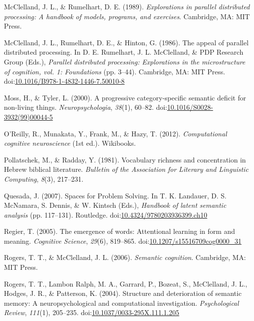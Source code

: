 \documentclass[english,man]{apa6}
\theoremstyle{definition}
\theoremstyle{definition}
\theoremstyle{definition}
\theoremstyle{remark}
\begin{document}
\hypertarget{ref-McClelland1989}{}
McClelland, J. L., \& Rumelhart, D. E. (1989). \emph{Explorations in
parallel distributed processing: A handbook of models, programs, and
exercises}. Cambridge, MA: MIT Press.

\hypertarget{ref-McClelland1988}{}
McClelland, J. L., Rumelhart, D. E., \& Hinton, G. (1986). The appeal of
parallel distributed processing. In D. E. Rumelhart, J. L. McClelland,
\& PDP Research Group (Eds.), \emph{Parallel distributed processing:
Explorations in the microstructure of cognition, vol. 1: Foundations}
(pp. 3--44). Cambridge, MA: MIT Press.
doi:\href{https://doi.org/10.1016/B978-1-4832-1446-7.50010-8}{10.1016/B978-1-4832-1446-7.50010-8}

\hypertarget{ref-Moss2000}{}
Moss, H., \& Tyler, L. (2000). A progressive category-specific semantic
deficit for non-living things. \emph{Neuropsychologia}, \emph{38}(1),
60--82.
doi:\href{https://doi.org/10.1016/S0028-3932(99)00044-5}{10.1016/S0028-3932(99)00044-5}

\hypertarget{ref-OReilly2012}{}
O'Reilly, R., Munakata, Y., Frank, M., \& Hazy, T. (2012).
\emph{Computational cognitive neuroscience} (1st ed.). Wikibooks.

\hypertarget{ref-Pollatschek1981}{}
Pollatschek, M., \& Radday, Y. (1981). Vocabulary richness and
concentration in Hebrew biblical literature. \emph{Bulletin of the
Association for Literary and Linguistic Computing}, \emph{8}(3),
217--231.

\hypertarget{ref-Quesada2001}{}
Quesada, J. (2007). Spaces for Problem Solving. In T. K. Landauer, D. S.
McNamara, S. Dennis, \& W. Kintsch (Eds.), \emph{Handbook of latent
semantic analysis} (pp. 117--131). Routledge.
doi:\href{https://doi.org/10.4324/9780203936399.ch10}{10.4324/9780203936399.ch10}

\hypertarget{ref-Regier2005}{}
Regier, T. (2005). The emergence of words: Attentional learning in form
and meaning. \emph{Cognitive Science}, \emph{29}(6), 819--865.
doi:\href{https://doi.org/10.1207/s15516709cog0000_31}{10.1207/s15516709cog0000\_31}

\hypertarget{ref-Rogers2006}{}
Rogers, T. T., \& McClelland, J. L. (2006). \emph{Semantic cognition}.
Cambridge, MA: MIT Press.

\hypertarget{ref-Rogers2004}{}
Rogers, T. T., Lambon Ralph, M. A., Garrard, P., Bozeat, S., McClelland,
J. L., Hodges, J. R., \& Patterson, K. (2004). Structure and
deterioration of semantic memory: A neuropsychological and computational
investigation. \emph{Psychological Review}, \emph{111}(1), 205--235.
doi:\href{https://doi.org/10.1037/0033-295X.111.1.205}{10.1037/0033-295X.111.1.205}
\end{document}
